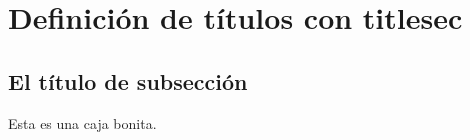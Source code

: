 \documentclass{oromion}
\begin{document}
\section{Definición de títulos con titlesec}
\lipsum[3]

\subsection{El título de subsección}
\begin{tcolorbox}[colback = red!50!white, colframe = blue!75!red, title= mi caja]
Esta es una caja bonita.
\end{tcolorbox}
\end{document}
